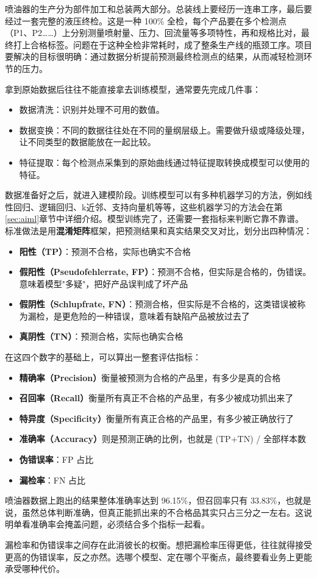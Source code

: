 喷油器的生产分为部件加工和总装两大部分。总装线上要经历一连串工序，最后要经过一套完整的液压终检。这是一种 100\% 全检，每个产品要在多个检测点（P1、P2……）上分别测量喷射量、压力、回流量等多项特性，再和规格比对，最终打上合格标签。问题在于这种全检非常耗时，成了整条生产线的瓶颈工序。项目要解决的目标很明确：通过数据分析提前预测最终检测点的结果，从而减轻检测环节的压力。

拿到原始数据后往往不能直接拿去训练模型，通常要先完成几件事：
\begin{itemize}
    \item 数据清洗：识别并处理不可用的数值。
    \item 数据变换：不同的数据往往处在不同的量纲层级上。需要做升级或降级处理，让不同类型的数据能放在一起比较。
    \item 特征提取：每个检测点采集到的原始曲线通过特征提取转换成模型可以使用的特征。
\end{itemize}

数据准备好之后，就进入建模阶段。训练模型可以有多种机器学习的方法，例如线性回归、逻辑回归、k近邻、支持向量机等等，这些机器学习的方法会在第\ref{sec:aiml}章节中详细介绍。模型训练完了，还需要一套指标来判断它靠不靠谱。标准做法是用\textbf{混淆矩阵}框架，把预测结果和真实结果交叉对比，划分出四种情况：
\begin{itemize}
    \item \textbf{阳性（TP）}：预测不合格，实际也确实不合格
    \item \textbf{假阳性（Pseudofehlerrate, FP）}：预测不合格，但实际是合格的，伪错误。意味着模型"多疑"，把好产品误判成了坏产品
    \item \textbf{假阴性（Schlupfrate, FN）}：预测合格，但实际是不合格的，这类错误被称为漏检，是更危险的一种错误，意味着有缺陷产品被放过去了
    \item \textbf{真阴性（TN）}：预测合格，实际也确实合格
\end{itemize}
在这四个数字的基础上，可以算出一整套评估指标：
\begin{itemize}
    \item\textbf{精确率（Precision）}衡量被预测为合格的产品里，有多少是真的合格
    \item \textbf{召回率（Recall）}衡量所有真正不合格的产品里，有多少被成功抓出来了
    \item \textbf{特异度（Specificity）}衡量所有真正合格的产品里，有多少被正确放行了
    \item \textbf{准确率（Accuracy）}则是预测正确的比例，也就是 (TP+TN) / 全部样本数
    \item \textbf{伪错误率}：FP 占比
    \item \textbf{漏检率}：FN 占比
\end{itemize}
喷油器数据上跑出的结果整体准确率达到 96.15\%，但召回率只有 33.83\%，也就是说，虽然总体判断准确，但真正能抓出来的不合格品其实只占三分之一左右。这说明单看准确率会掩盖问题，必须结合多个指标一起看。

漏检率和伪错误率之间存在此消彼长的权衡。想把漏检率压得更低，往往就得接受更高的伪错误率，反之亦然。选哪个模型、定在哪个平衡点，最终要看业务上更能承受哪种代价。

